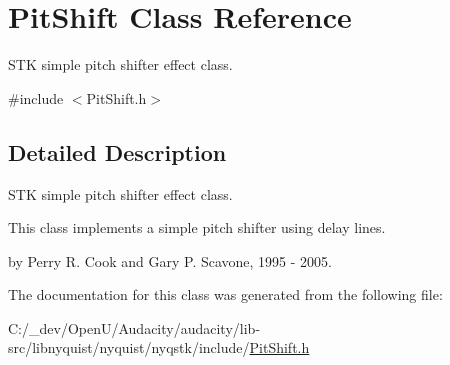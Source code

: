 \hypertarget{class_pit_shift}{}\section{Pit\+Shift Class Reference}
\label{class_pit_shift}


S\+TK simple pitch shifter effect class.  




{\ttfamily \#include $<$Pit\+Shift.\+h$>$}



\subsection{Detailed Description}
S\+TK simple pitch shifter effect class. 

This class implements a simple pitch shifter using delay lines.

by Perry R. Cook and Gary P. Scavone, 1995 -\/ 2005. 

The documentation for this class was generated from the following file\+:\begin{DoxyCompactItemize}
\item 
C\+:/\+\_\+dev/\+Open\+U/\+Audacity/audacity/lib-\/src/libnyquist/nyquist/nyqstk/include/\hyperlink{_pit_shift_8h}{Pit\+Shift.\+h}\end{DoxyCompactItemize}
